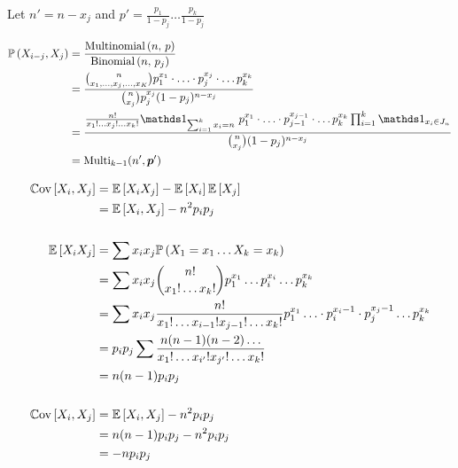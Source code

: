 \documentclass[12pt]{article}
\begin{document}
\begin{enumerate}

Let $n' = n-x_j$ and $p' = \frac{p_1}{1-p_j} \ldots \frac{p_k}{1-p_j}$

\begin{align*}
    \prob{X_{i-j}, X_j} &= \frac{\multinomial{n}{p}}{\binomial{n}{p_j}} \\
    &= \frac{\binom{n}{x_1, \ldots, x_j, \ldots, x_K} p_1^{x_1}\cdot\ldots\cdot p_j^{x_j}\cdot\ldots p_k^{x_k}}{\binom{n}{x_j} p_j^{x_j}(1-p_j)^{n-x_j}} \\
    &= \frac{\frac{n!}{x_1!\ldots x_j! \ldots x_k!} \indic{\sum_{i=1}^{k} x_i = n} ~ p_1^{x_1}\cdot\ldots\cdot p_{j-1}^{x_{j-1}}\cdot\ldots p_k^{x_k} \prod_{i=1}^{k} \indic{x_i \in J_n}}{\binom{n}{x_j} (1-p_j)^{n-x_j}} \\
    &= \text{Multi}_{k-1}(n', \p') \\
\end{align*}



\begin{align*}
    \mathbb{C}\text{ov}\left[X_i, X_j\right] &= \mathbb{E}\left[X_iX_j\right] - \mathbb{E}\left[X_i\right]\mathbb{E}\left[X_j\right] \\
    &= \mathbb{E}\left[X_i, X_j\right] - n^2p_ip_j \\\\
    \mathbb{E}\left[X_iX_j\right] &= \sum x_i x_j \mathbb{P}\left(X_1=x_1 \ldots X_k=x_k\right) \\
    &= \sum x_ix_j\binom{n!}{x_1!\ldots x_k!} p_1^{x_1} \ldots p_i^{x_i} \ldots p_k^{x_k} \\
    &= \sum x_ix_j \frac{n!}{x_1!\ldots x_{i-1}! x_{j-1}!\ldots x_k!} p_1^{x_1}\ldots \cdot p_i^{x_i-1} \cdot p_j^{x_j-1} \ldots p_k^{x_k} \\
    &= p_ip_j \sum \frac{n(n-1)(n-2) \ldots}{x_1! \ldots x_{i'}!x_{j'}!\ldots x_k!} \\
    &= n(n-1)p_ip_j  \\ \\
    \mathbb{C}\text{ov}\left[X_i, X_j\right] &= \mathbb{E}\left[X_i, X_j\right] - n^2p_ip_j \\
    &= n(n-1)p_ip_j - n^2p_ip_j \\
    &= -np_ip_j
\end{align*}



\end{enumerate}
\end{document}
